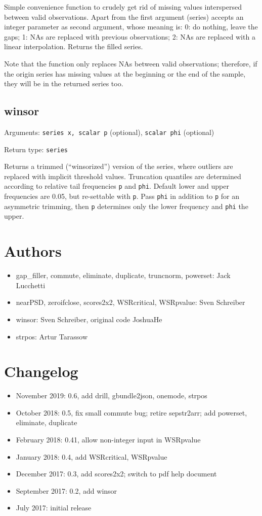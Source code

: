 \documentclass[11pt,english]{article}
\begin{document}
Simple convenience function to crudely get rid of missing values
interspersed between valid observations. Apart from the first argument
(series) accepts an integer parameter as second argument, whose
meaning is: 0: do nothing, leave the gaps; 1: NAs are replaced with
previous observations; 2: NAs are replaced with a linear
interpolation. Returns the filled series.

Note that the function only replaces NAs between valid observations;
therefore, if the origin series has missing values at the beginning or
the end of the sample, they will be in the returned series too.

\subsection{winsor}

Arguments: \texttt{series x, scalar p} (optional), \texttt{scalar
phi} (optional) 

\noindent Return type: \texttt{series}

Returns a trimmed (``winsorized'') version
of the series, where outliers are replaced with implicit threshold
values. Truncation quantiles are determined according to relative
tail frequencies \texttt{p} and \texttt{phi}. Default lower and upper
frequencies are 0.05, but re-settable with \texttt{p}. Pass \texttt{phi}
in addition to \texttt{p} for an asymmetric trimming, then \texttt{p}
determines only the lower frequency and \texttt{phi} the upper. 

\section{Authors}
\begin{itemize}
\item gap\_filler, commute, eliminate, duplicate, truncnorm, powerset: Jack Lucchetti
\item nearPSD, zeroifclose, scores2x2, WSRcritical, WSRpvalue:
Sven Schreiber 
\item winsor: Sven Schreiber, original code JoshuaHe
\item strpos: Artur Tarassow
\end{itemize}

\section{Changelog }
\begin{itemize}
\item November 2019: 0.6, add drill, gbundle2json, onemode, strpos
\item October 2018: 0.5, fix small commute bug; retire sepstr2arr; add powerset,
  eliminate, duplicate
\item February 2018: 0.41, allow non-integer input in WSRpvalue
\item January 2018: 0.4, add WSRcritical, WSRpvalue
\item December 2017: 0.3, add scores2x2; switch to pdf help document
\item September 2017: 0.2, add winsor 
\item July 2017: initial release
\end{itemize}
\end{document}
